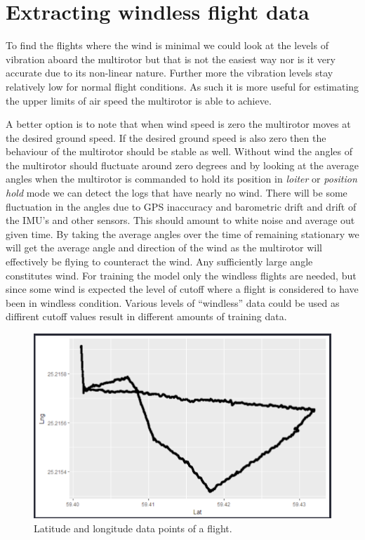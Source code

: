 \documentclass[12pt,oneside]{reedthesis}
\theoremstyle{definition}
\theoremstyle{definition}
\theoremstyle{definition}
\theoremstyle{remark}
\begin{document}
\hypertarget{extracting-windless-flight-data}{\section{Extracting
windless flight data}\label{extracting-windless-flight-data}}

To find the flights where the wind is minimal we could look at the
levels of vibration aboard the multirotor but that is not the easiest
way nor is it very accurate due to its non-linear nature. Further more
the vibration levels stay relatively low for normal flight conditions.
As such it is more useful for estimating the upper limits of air speed
the multirotor is able to achieve.

A better option is to note that when wind speed is zero the multirotor
moves at the desired ground speed. If the desired ground speed is also
zero then the behaviour of the multirotor should be stable as well.
Without wind the angles of the multirotor should fluctuate around zero
degrees and by looking at the average angles when the multirotor is
commanded to hold its position in \emph{loiter} or \emph{position}
\emph{hold} mode we can detect the logs that have nearly no wind. There
will be some fluctuation in the angles due to GPS inaccuracy and
barometric drift and drift of the IMU's and other sensors. This should
amount to white noise and average out given time. By taking the average
angles over the time of remaining stationary we will get the average
angle and direction of the wind as the multirotor will effectively be
flying to counteract the wind. Any sufficiently large angle constitutes
wind. For training the model only the windless flights are needed, but
since some wind is expected the level of cutoff where a flight is
considered to have been in windless condition. Various levels of
``windless'' data could be used as diffirent cutoff values result in
different amounts of training data.
\begin{figure}
\centering
\includegraphics{./figure/latlng.PNG}
\caption{\label{fig:latlng}Latitude and longitude data points of a flight.}
\end{figure}
\end{document}
